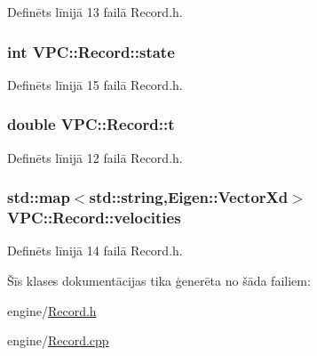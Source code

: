 Definēts līnijā 13 failā Record.\+h.

\subsubsection[{\texorpdfstring{state}{state}}]{\setlength{\rightskip}{0pt plus 5cm}int V\+P\+C\+::\+Record\+::state}\hypertarget{class_v_p_c_1_1_record_aefdcae9a398f483c7a4c61b6a43307e5}{}\label{class_v_p_c_1_1_record_aefdcae9a398f483c7a4c61b6a43307e5}


Definēts līnijā 15 failā Record.\+h.

\subsubsection[{\texorpdfstring{t}{t}}]{\setlength{\rightskip}{0pt plus 5cm}double V\+P\+C\+::\+Record\+::t}\hypertarget{class_v_p_c_1_1_record_af9b5867d85eb7d0073ced8bd09a79626}{}\label{class_v_p_c_1_1_record_af9b5867d85eb7d0073ced8bd09a79626}


Definēts līnijā 12 failā Record.\+h.

\subsubsection[{\texorpdfstring{velocities}{velocities}}]{\setlength{\rightskip}{0pt plus 5cm}std\+::map$<$std\+::string,Eigen\+::\+Vector\+Xd$>$ V\+P\+C\+::\+Record\+::velocities}\hypertarget{class_v_p_c_1_1_record_a6d0ac69f7cb390fd819cb006f23d6e32}{}\label{class_v_p_c_1_1_record_a6d0ac69f7cb390fd819cb006f23d6e32}


Definēts līnijā 14 failā Record.\+h.



Šīs klases dokumentācijas tika ģenerēta no šāda failiem\+:\begin{DoxyCompactItemize}
\item 
engine/\hyperlink{_record_8h}{Record.\+h}\item 
engine/\hyperlink{_record_8cpp}{Record.\+cpp}\end{DoxyCompactItemize}
